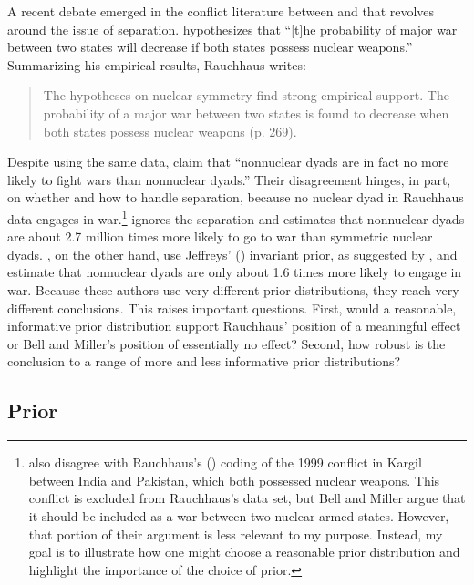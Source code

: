 \documentclass[12pt]{article}
\begin{document}
A recent debate emerged in the conflict literature between \cite{Rauchhaus2009} and \cite{BellMiller2015} that revolves around the issue of separation. \citet[p. 262]{Rauchhaus2009} hypothesizes that ``[t]he probability of major war between two states will decrease if both states possess nuclear weapons.'' Summarizing his empirical results, Rauchhaus writes:

\begin{quote} 
The hypotheses on nuclear symmetry find strong empirical support. The probability of a major war between two states is found to decrease when both states possess nuclear weapons (p. 269).
\end{quote}

Despite using the same data, \citet[p. 9]{BellMiller2015} claim that ``nonnuclear dyads are in fact no more likely to fight wars than nonnuclear dyads.'' Their disagreement hinges, in part, on whether and how to handle separation, because no nuclear dyad in Rauchhaus data engages in war.\footnote{\cite{BellMiller2015} also disagree with Rauchhaus's (\citeyear{Rauchhaus2009}) coding of the 1999 conflict in Kargil between India and Pakistan, which both possessed nuclear weapons. This conflict is excluded from Rauchhaus's data set, but Bell and Miller argue that it should be included as a war between two nuclear-armed states. However, that portion of their argument is less relevant to my purpose. Instead, my goal is to illustrate how one might choose a reasonable prior distribution and highlight the importance of the choice of prior.} \cite{Rauchhaus2009} ignores the separation and estimates that nonnuclear dyads are about 2.7 million times more likely to go to war than symmetric nuclear dyads. \cite{BellMiller2015}, on the other hand, use Jeffreys' (\citeyear{Jeffreys1946}) invariant prior, as suggested by \cite{Zorn2005}, and estimate that nonnuclear dyads are only about 1.6 times more likely to engage in war. Because these authors use very different prior distributions, they reach very different conclusions. This raises important questions. First, would a reasonable, informative prior distribution support Rauchhaus' position of a meaningful effect or Bell and Miller's position of essentially no effect? Second, how robust is the conclusion to a range of more and less informative prior distributions?

\subsection*{Prior}
\end{document}
